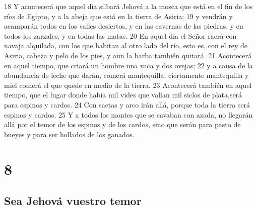 18 Y acontecerá que aquel día silbará Jehová a la mosca que está en el fin de los ríos de Egipto, y a la abeja que está en la tierra de Asiria;
19 y vendrán y acamparán todos en los valles desiertos, y en las cavernas de las piedras, y en todos los zarzales, y en todas las matas.
20 En aquel día el Señor raerá con navaja alquilada, con los que habitan al otro lado del río, esto es, con el rey de Asiria, cabeza y pelo de los pies, y aun la barba también quitará.
21 Acontecerá en aquel tiempo, que criará un hombre una vaca y dos ovejas;
22 y a causa de la abundancia de leche que darán, comerá mantequilla; ciertamente mantequilla y miel comerá el que quede en medio de la tierra.
23 Acontecerá también en aquel tiempo, que el lugar donde había mil vides que valían mil siclos de plata,será para espinos y cardos.
24 Con saetas y arco irán allá, porque toda la tierra será espinos y cardos.
25 Y a todos los montes que se cavaban con azada, no llegarán allá por el temor de los espinos y de los cardos, sino que serán para pasto de bueyes y para ser hollados de los ganados.

\chapter{8}

\section*{Sea Jehová vuestro temor}

